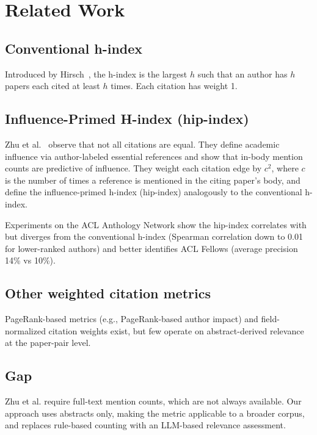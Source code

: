 \section{Related Work}

\subsection{Conventional h-index}

Introduced by Hirsch~\cite{hirsch2005}, the h-index is the largest $h$ such that an author has $h$ papers each cited at least $h$ times. Each citation has weight 1.

\subsection{Influence-Primed H-index (hip-index)}

Zhu et al.~\cite{zhu2015measuring} observe that not all citations are equal. They define academic influence via author-labeled essential references and show that in-body mention counts are predictive of influence. They weight each citation edge by $c^2$, where $c$ is the number of times a reference is mentioned in the citing paper's body, and define the influence-primed h-index (hip-index) analogously to the conventional h-index.

Experiments on the ACL Anthology Network show the hip-index correlates with but diverges from the conventional h-index (Spearman correlation down to 0.01 for lower-ranked authors) and better identifies ACL Fellows (average precision 14\% vs 10\%).

\subsection{Other weighted citation metrics}

PageRank-based metrics (e.g., PageRank-based author impact) and field-normalized citation weights exist, but few operate on abstract-derived relevance at the paper-pair level.

\subsection{Gap}

Zhu et al. require full-text mention counts, which are not always available. Our approach uses abstracts only, making the metric applicable to a broader corpus, and replaces rule-based counting with an LLM-based relevance assessment.
